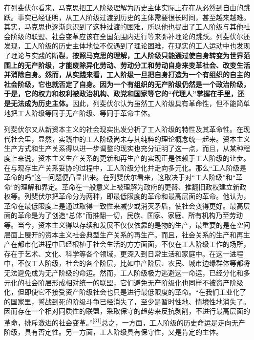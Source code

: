 \documentclass[UTF8, fontset = sourcesans, a4paper, oneside, zihao =
-4, scheme=chinese, no-math, space=true]{ctexbook}
\begin{document}
在列斐伏尔看来，马克思把工人阶级理解为历史主体实际上存在从必然到自由的跳跃。事实已经证明，从工人阶级过渡到历史的主体需要很长时间，甚至越来越难。其实，马克思也逐渐意识到了这种过渡的困难，所以他也提出了工人阶级与其他社会阶级的联盟、社会变革应该在全国范围内进行等来弥补理论的跳跃。列斐伏尔还发现，工人阶级的历史主体地位不仅遇到了理论困难，在现实的工人运动中也发现了理论与实践的断裂。\textbf{按照马克思的理解，工人阶级只能通过使自身转变为世界范围上的无产阶级，才能废除异化劳动、劳动分工和劳动自身来变革社会、改变生活并消除自身。然而，从实践来看，工人阶级一旦把自身打造为一个有组织的自主的社会阶级，它也就否定了自身。因为一个有组织的无产阶级仍然是一个政治阶级，于是，它的权力和权利被政治机构、政党和国家等它的``代理人''掌握在手里，还是无法成为历史主体。}因此，列斐伏尔认为虽然工人阶级具有革命性，但不能简单地把工人阶级等同于无产阶级、等同于革命主体。

列斐伏尔又从新资本主义的社会现实出发分析了工人阶级的特性及其革命性。在现代社会里，显然，实践中的工人阶级尚未与其纯粹的理论概念统一起来。资本主义生产方式和生产关系得以进一步调整的现实也充分证明了这一点，而且，从某种程度上来说，资本主义生产关系的更新和再生产的实现正是依赖于工人阶级的让步。在与现存生产关系妥协的过程中，工人阶级分化并走向多元化。那么``工人阶级是革命的吗''这一问题便凸显出来。在列斐伏尔看来，这取决于对``工人阶级''和``革命''的理解和界定。革命在一般意义上被理解为政府的更替、推翻旧政权建立新政权等。列斐伏尔把革命分为两种，即最低限度的革命和最高层面的革命。他认为，革命在最低限度上是通过取得一致性来减少或消灭矛盾，使社会变得更好。最高层面的革命是为了创造``总体''而推翻一切，民族、国家、家庭、所有机构乃至劳动等。当今，资本主义得以存续和发展不仅仅依靠的是物的生产，最重要的是在空间层面上展开的资本主义社会典型生产关系的再生产。而且，社会关系的生产和再生产在都市化进程中已经根植于社会生活的方方面面，不仅在工人阶级工作的场所，存在于艺术、文化、科学等各个领域，更深入到日常生活和家庭中。在这一进程中，不仅工人阶级，社会的各个阶层，比如中产阶层、农民、城市边缘群体等都将无法避免成为无产阶级的命运。然而，工人阶级极力逃避这一命运，已经分化和多元化的社会阶层形成相对统一的联盟，它们避免无产阶级化也同样不被资产阶级化，但即使它不接受资产阶级社会也只是进行最低限度的革命。``在我们工业化了的国家里，誓战到死的阶级斗争已经消失了，至少是暂时性地、情境性地消失了。因而存在一个相对同质性的联盟，采取保守的趋势来反抗剥削，不进行最高层面的革命，排斥激进的社会变革。''\protect\hypertarget{part0008_split_002.htmlux5cux23w31}{}{}\protect\hyperlink{part0008_split_003.htmlux5cux23m31}{\textsuperscript{{[}31{]}}}总之，一方面，工人阶级的历史命运是走向无产阶级，具有否定性。另一方面，工人阶级具有保守性，又是肯定的主体。
\end{document}
